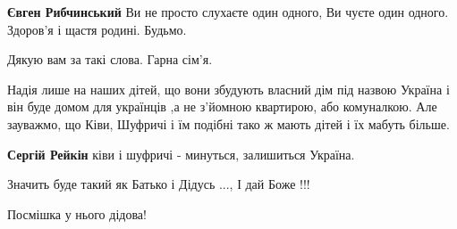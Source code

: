 \begin{itemize}
\begin{itemize}
\begin{itemize}
\textbf{Євген Рибчинський} Ви не просто слухаєте один одного, Ви чуєте один одного. Здоров'я і щастя родині. Будьмо.
\end{itemize}

\end{itemize}

 
Дякую вам за такі слова. Гарна сім'я.

 

Надія лише на наших дітей, що вони збудують власний дім під назвою Україна і він
буде домом для українців ,а не з'йомною квартирою, або комуналкою. Але
зауважмо, що Ківи, Шуфричі і їм подібні тако ж мають дітей і їх мабуть більше.

\begin{itemize}
 
\textbf{Сергій Рейкін} ківи і шуфричі - минуться, залишиться Україна.
\end{itemize}

 
Значить буде такий як Батько і Дідусь ..., І дай Боже !!!

 
Посмішка у нього дідова!🤗

 

\end{itemize}
